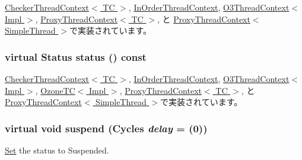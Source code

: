 \hyperlink{classCheckerThreadContext_a1ff97b43199001357718671a4d922d12}{CheckerThreadContext$<$ TC $>$}, \hyperlink{classInOrderThreadContext_a1ff97b43199001357718671a4d922d12}{InOrderThreadContext}, \hyperlink{classO3ThreadContext_ac778b8592630d93d3cecb6a663a6f038}{O3ThreadContext$<$ Impl $>$}, \hyperlink{classProxyThreadContext_a1ff97b43199001357718671a4d922d12}{ProxyThreadContext$<$ TC $>$}, と \hyperlink{classProxyThreadContext_a1ff97b43199001357718671a4d922d12}{ProxyThreadContext$<$ SimpleThread $>$}で実装されています。\hypertarget{classThreadContext_adfba9b39542cba955a02b8ff3ba023a9}{
\subsubsection[{status}]{\setlength{\rightskip}{0pt plus 5cm}virtual {\bf Status} status () const}}
\label{classThreadContext_adfba9b39542cba955a02b8ff3ba023a9}


\hyperlink{classCheckerThreadContext_a2ad9e92a82d6f783b3061584729c2f4a}{CheckerThreadContext$<$ TC $>$}, \hyperlink{classInOrderThreadContext_a2ad9e92a82d6f783b3061584729c2f4a}{InOrderThreadContext}, \hyperlink{classO3ThreadContext_aac0de8e2cbe41c149f875d5b7ecba1d5}{O3ThreadContext$<$ Impl $>$}, \hyperlink{classOzoneCPU_1_1OzoneTC_a2ad9e92a82d6f783b3061584729c2f4a}{OzoneTC$<$ Impl $>$}, \hyperlink{classProxyThreadContext_a2ad9e92a82d6f783b3061584729c2f4a}{ProxyThreadContext$<$ TC $>$}, と \hyperlink{classProxyThreadContext_a2ad9e92a82d6f783b3061584729c2f4a}{ProxyThreadContext$<$ SimpleThread $>$}で実装されています。\hypertarget{classThreadContext_af2ae27d19d77b0301484ac488d97d37b}{
\subsubsection[{suspend}]{\setlength{\rightskip}{0pt plus 5cm}virtual void suspend ({\bf Cycles} {\em delay} = {(0)})}}
\label{classThreadContext_af2ae27d19d77b0301484ac488d97d37b}


\hyperlink{classSet}{Set} the status to Suspended. 

